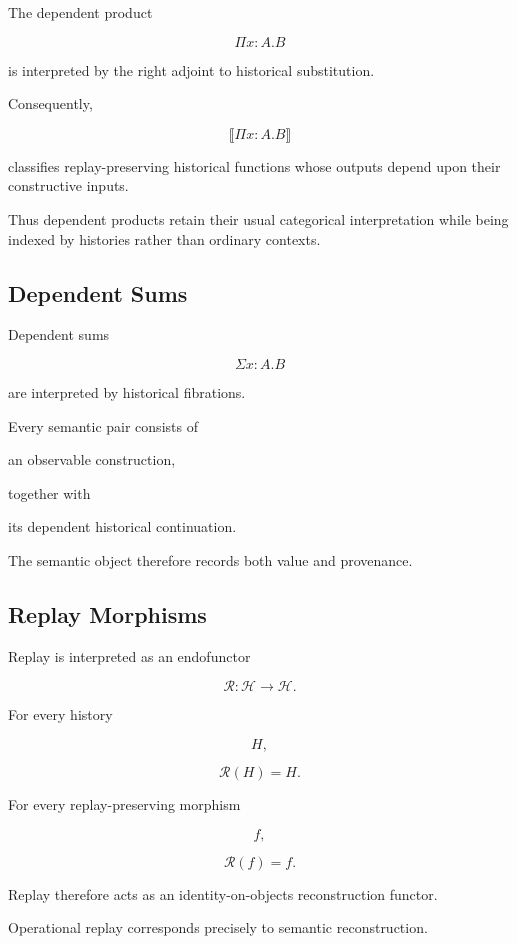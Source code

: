 \documentclass[12pt,oneside]{article}
\theoremstyle{definition}
\theoremstyle{remark}
\begin{document}
The dependent product

\[
\Pi
x:A.
B
\]

is interpreted by the right adjoint to historical substitution.

Consequently,

\[
\llbracket
\Pi
x:A.B
\rrbracket
\]

classifies replay-preserving historical functions whose outputs depend upon
their constructive inputs.

Thus dependent products retain their usual categorical interpretation while
being indexed by histories rather than ordinary contexts.


\subsection{Dependent Sums}

Dependent sums

\[
\Sigma
x:A.
B
\]

are interpreted by historical fibrations.

Every semantic pair consists of

an observable construction,

together with

its dependent historical continuation.

The semantic object therefore records both value and provenance.


\subsection{Replay Morphisms}

Replay is interpreted as an endofunctor

\[
\mathcal R
:
\mathcal H
\rightarrow
\mathcal H.
\]

For every history

\[
H,
\]

\[
\mathcal R(H)
=
H.
\]

For every replay-preserving morphism

\[
f,
\]

\[
\mathcal R(f)
=
f.
\]

Replay therefore acts as an identity-on-objects reconstruction functor.

Operational replay corresponds precisely to semantic reconstruction.
\end{document}
